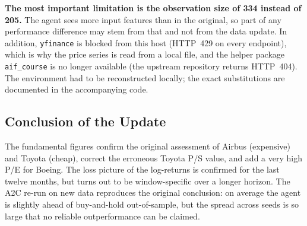 \textbf{The most important limitation is the observation size of 334 instead of 205.} The
agent sees more input features than in the original, so part of any performance difference
may stem from that and not from the data update. In addition, \texttt{yfinance} is blocked
from this host (HTTP~429 on every endpoint), which is why the price series is read from a
local file, and the helper package \texttt{aif\_course} is no longer
available (the upstream repository returns HTTP~404). The environment had to be
reconstructed locally; the exact substitutions are documented in the accompanying code.

\subsection{Conclusion of the Update}

The fundamental figures confirm the original assessment of Airbus (expensive) and Toyota
(cheap), correct the erroneous Toyota P/S value, and add a very high P/E for Boeing. The
loss picture of the log-returns is confirmed for the last twelve months, but turns out to be
window-specific over a longer horizon. The A2C re-run on new data reproduces the original
conclusion: on average the agent is slightly ahead of buy-and-hold out-of-sample, but the
spread across seeds is so large that no reliable outperformance can be claimed.
